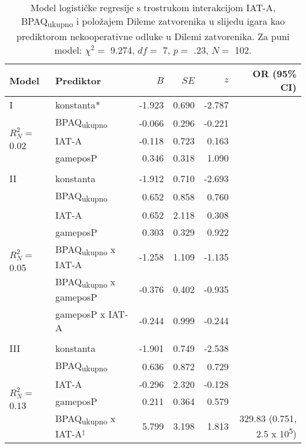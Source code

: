 \documentclass[a4paper, 12pt]{report}
\begin{document}
\begin{appendices}
\vspace*{\fill}
\begin{table}[h]
    \begin{center}
        \caption{\label{glmtotposP} Model logističke regresije s trostrukom interakcijom IAT-A,
            BPAQ\textsubscript{ukupno} i položajem Dileme zatvorenika u slijedu
            igara kao prediktorom
            nekooperativne odluke u Dilemi zatvorenika. 
            Za puni model: $\chi^2 =$ 9.274, $df =$ 7, $p =$ .23, $N
            =$ 102.}
        \hspace*{-0.7cm}\begin{tabular}{llrrrr}
        \toprule
        Model & Prediktor & $B$ & $SE$ & $z$ & OR (95\% CI)\\
        \midrule
        I & konstanta* & -1.923 & 0.690 & -2.787 &\\
        \multirow{3}{*}{$R^2_N =$ 0.02}
        &BPAQ\textsubscript{ukupno} & -0.066 & 0.296 & -0.221 &\\
        &IAT-A & -0.118 & 0.723 & 0.163 &\\
        &gameposP & 0.346 & 0.318 & 1.090  &\\
        &&&&&\\ 
        II & konstanta & -1.912 & 0.710 & -2.693 &\\
        \multirow{6}{*}{$R^2_N =$ 0.05}
        &BPAQ\textsubscript{ukupno} & 0.652 & 0.858 & 0.760 &\\
        &IAT-A & 0.652 & 2.118 & 0.308 &\\
        &gameposP & 0.303 & 0.329 & 0.922 &\\
        &BPAQ\textsubscript{ukupno} x IAT-A & -1.258 & 1.109 & -1.135 &\\
        &BPAQ\textsubscript{ukupno} x gameposP & -0.376 & 0.402 & -0.935 &\\
        &gameposP x IAT-A & -0.244 & 0.999 & -0.244 &\\
        &&&&&\\ 
        III & konstanta & -1.901 & 0.749 & -2.538 &\\
        \multirow{7}{*}{$R^2_N =$ 0.13}
        &BPAQ\textsubscript{ukupno} & 0.636 & 0.872 & 0.729 & \\
        &IAT-A & -0.296 & 2.320 & -0.128 &\\
        &gameposP & 0.211 & 0.364 & 0.579  &\\
        &BPAQ\textsubscript{ukupno} x IAT-A$^\ddagger$ & 5.799 & 3.198 & 1.813 &
        329.83 (0.751, 2.5 x 10\textsuperscript{5})\\

\end{tabular}
\end{center}
\end{table}
\end{appendices}
\end{document}
